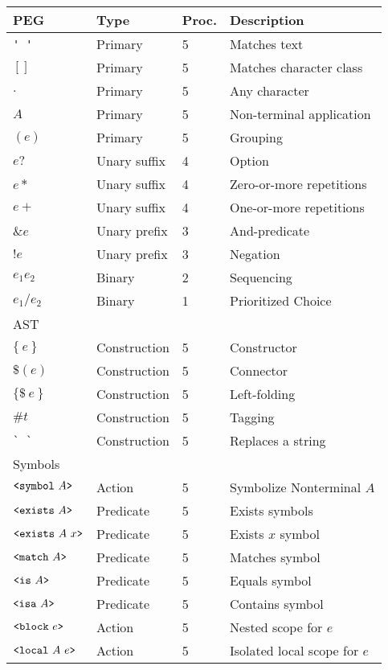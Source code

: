 \documentclass[preprint]{sigplanconf}
\begin{document}
\begin{table}[bt]
\begin{center}
\begin{tabular}{llll} \hline
PEG  & Type & Proc. & Description\\ \hline
\verb|' '| & Primary & 5 & Matches text\\
$[ ]$ & Primary & 5 & Matches character class \\
$.$ & Primary & 5 & Any character\\
$A$ & Primary & 5 & Non-terminal application\\
$( e )$ & Primary & 5 & Grouping\\
$e?$ & Unary suffix & 4 & Option\\
$e*$ & Unary suffix & 4 & Zero-or-more repetitions\\
$e+$ & Unary suffix & 4 & One-or-more repetitions\\
$\&e$ & Unary prefix & 3 & And-predicate\\
$!e$ & Unary prefix & 3 & Negation\\
$e_1 e_2$ & Binary & 2 & Sequencing\\
$e_1 / e_2$ & Binary & 1 & Prioritized Choice\\ \hline

AST  &  &  & \\ \hline

$\{~e~\}$ & Construction & 5 & Constructor\\
$\$(e)$ & Construction & 5 & Connector \\
$\{\$~e~\}$ & Construction & 5 & Left-folding\\ 
$\#t$ & Construction & 5 & Tagging \\
\verb|` `| & Construction & 5 & Replaces a string \\ \hline

Symbols  &  &  & \\ \hline

$\verb|<symbol| ~A\verb|>|$ & Action & 5 & Symbolize Nonterminal $A$ \\ 
$\verb|<exists| ~A \verb|>|$ & Predicate & 5 & Exists symbols \\ 
$\verb|<exists| ~A~x\verb|>|$ & Predicate & 5 & Exists $x$ symbol \\ 
$\verb|<match| ~A\verb|>|$ & Predicate & 5 & Matches symbol \\ 
$\verb|<is| ~A\verb|>|$ & Predicate & 5 & Equals symbol \\ 
$\verb|<isa| ~A\verb|>|$ & Predicate & 5 & Contains symbol \\ 
$\verb|<block| ~e\verb|>|$ & Action & 5 & Nested scope for $e$ \\ 
$\verb|<local| ~A~e\verb|>|$ & Action & 5 & Isolated local scope for $e$ \\ \hline 


\end{tabular}
\end{center}
\end{table}
\end{document}
